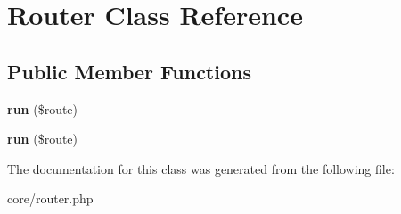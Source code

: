 \hypertarget{classRouter}{}\section{Router Class Reference}
\label{classRouter}
\subsection*{Public Member Functions}
\begin{DoxyCompactItemize}
\item 
{\bfseries run} (\$route)\hypertarget{classRouter_a4d7e3f145153d12a49ae4e63bacc073f}{}\label{classRouter_a4d7e3f145153d12a49ae4e63bacc073f}

\item 
{\bfseries run} (\$route)\hypertarget{classRouter_a4d7e3f145153d12a49ae4e63bacc073f}{}\label{classRouter_a4d7e3f145153d12a49ae4e63bacc073f}

\end{DoxyCompactItemize}


The documentation for this class was generated from the following file\+:\begin{DoxyCompactItemize}
\item 
core/router.\+php\end{DoxyCompactItemize}
